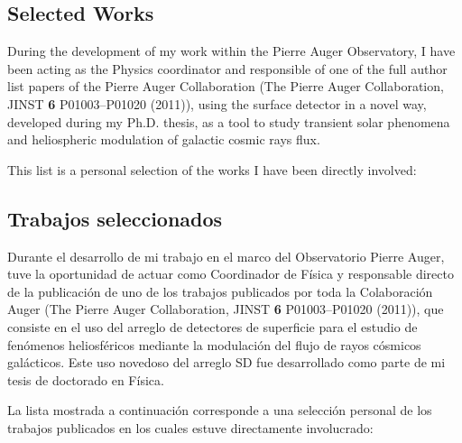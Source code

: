 \ifeng
\subsection*{Selected Works}
\noindent
During the development of my work within the Pierre Auger Observatory, I have
been acting as the Physics coordinator and responsible of one of the full
author list papers of the Pierre Auger Collaboration (The Pierre Auger
Collaboration, JINST {\bf 6} P01003--P01020 (2011)), using the surface detector
in a novel way, developed during my Ph.D. thesis, as a tool to study transient
solar phenomena and heliospheric modulation of galactic cosmic rays flux.

This list is a personal selection of the works I have been directly involved:

\else
\subsection*{Trabajos seleccionados}
\noindent
Durante el desarrollo de mi trabajo en el marco del Observatorio Pierre Auger, tuve la oportunidad de actuar como Coordinador de Física y responsable directo de la publicación de uno de los trabajos publicados por toda la Colaboración Auger (The Pierre Auger Collaboration, JINST {\bf 6} P01003--P01020 (2011)), que consiste en el uso del arreglo de detectores de superficie para el estudio de fenómenos heliosféricos mediante la modulación del flujo de rayos cósmicos galácticos. Este uso novedoso del arreglo SD fue desarrollado como parte de mi tesis de doctorado en Física.

La lista mostrada a continuación corresponde a una selección personal de los trabajos publicados en los cuales estuve directamente involucrado:

\fi

